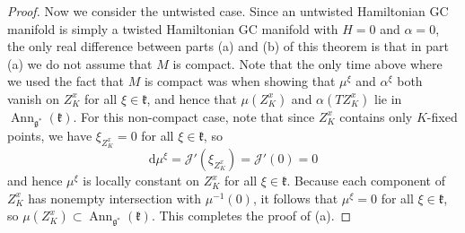 \documentclass[11pt]{article}
\numberwithin{equation}{section}
\newcommand{\tang}{T}
\begin{document}
\begin{proof}
Now we consider the untwisted case.
Since an untwisted Hamiltonian GC manifold is simply a twisted Hamiltonian GC manifold with $H=0$ and $\alpha = 0$, the only real dif\/ference between parts (a) and (b) of this theorem is that in part (a) we do not assume that $M$ is compact.
Note that the only time above where we used the fact that $M$ is compact was when showing that $\mu^{\xi}$ and $\alpha^{\xi}$ both vanish on $Z_K^x$ for all $\xi \in \mathfrak{k}$, and hence that $\mu(Z_K^x)$ and $\alpha( \tang Z_K^x)$ lie in $\operatorname{Ann}_{\mathfrak{g}^*} (\mathfrak{k})$.
For this non-compact case, note that since $Z_K^x$ contains only $K$-f\/ixed points, we have $\xi_{Z_K^x} = 0$ for all $\xi \in \mathfrak{k}$, so
\[
  \mathrm{d} \mu^{\xi} = \mathcal{J}'(\xi_{Z_K^x})
  = \mathcal{J}'(0) = 0
\]
and hence $\mu^{\xi}$ is locally constant on $Z_K^x$ for all $\xi \in \mathfrak{k}$.
Because each component of $Z_K^x$ has nonempty intersection with $\mu^{-1}(0)$, it follows that $\mu^{\xi} = 0$ for all $\xi \in \mathfrak{k}$, so $\mu(Z_K^x) \subset \operatorname{Ann}_{\mathfrak{g}^*} (\mathfrak{k})$.
This completes the proof of (a).
\end{proof}
\end{document}
